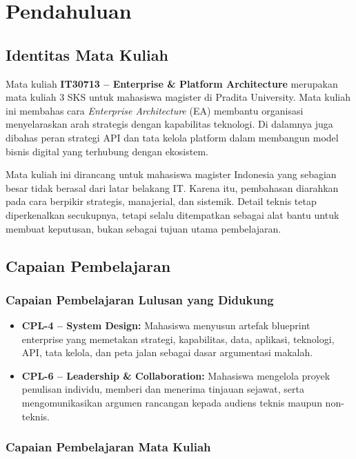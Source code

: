 \chapter{Pendahuluan}

\section{Identitas Mata Kuliah}

Mata kuliah \textbf{IT30713 -- Enterprise \& Platform Architecture} merupakan
mata kuliah 3 SKS untuk mahasiswa magister di Pradita University. Mata kuliah
ini membahas cara \emph{Enterprise Architecture} (EA) membantu organisasi
menyelaraskan arah strategis dengan kapabilitas teknologi. Di dalamnya juga
dibahas peran strategi API dan tata kelola platform dalam membangun model
bisnis digital yang terhubung dengan ekosistem.

Mata kuliah ini dirancang untuk mahasiswa magister Indonesia yang sebagian
besar tidak berasal dari latar belakang IT. Karena itu, pembahasan diarahkan
pada cara berpikir strategis, manajerial, dan sistemik. Detail teknis tetap
diperkenalkan secukupnya, tetapi selalu ditempatkan sebagai alat bantu untuk
membuat keputusan, bukan sebagai tujuan utama pembelajaran.

\section{Capaian Pembelajaran}

\subsection{Capaian Pembelajaran Lulusan yang Didukung}

\begin{itemize}
    \item \textbf{CPL-4 -- System Design:} Mahasiswa menyusun artefak blueprint
    enterprise yang memetakan strategi, kapabilitas, data, aplikasi, teknologi,
    API, tata kelola, dan peta jalan sebagai dasar argumentasi makalah.
    \item \textbf{CPL-6 -- Leadership \& Collaboration:} Mahasiswa mengelola
    proyek penulisan individu, memberi dan menerima tinjauan sejawat, serta
    mengomunikasikan argumen rancangan kepada audiens teknis maupun non-teknis.
\end{itemize}

\subsection{Capaian Pembelajaran Mata Kuliah}

